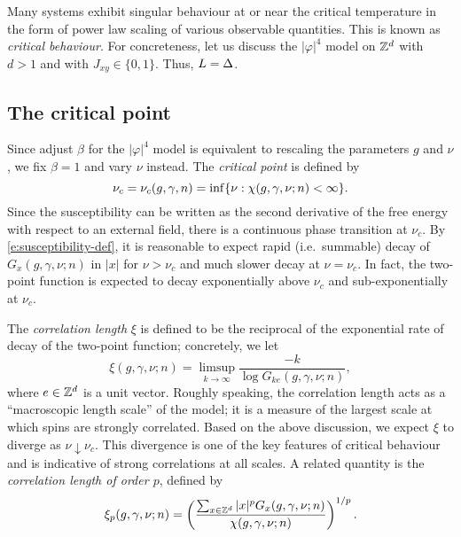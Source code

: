 Many systems exhibit singular behaviour at or near the critical temperature in
the form of power law scaling of various observable quantities. This is known as
\emph{critical behaviour}. For concreteness, let us discuss the $|\varphi|^4$ model
on ${ {{\mathbb Z}}^d }$ with $d > 1$ and with $J_{xy} \in \{ 0, 1 \}$. Thus, $L = \Delta$.

\subsection{The critical point}

Since adjust $\beta$ for the $|\varphi|^4$ model is equivalent to rescaling the
parameters $g$ and $\nu$, we fix $\beta = 1$ and vary $\nu$ instead.
The \emph{critical point} is defined by
\begin{equation}
\nu_c = \nu_c(g, \gamma, n) = \inf \{ \nu : \chi(g, \gamma, \nu; n) < \infty \}.
\end{equation}
Since the susceptibility can be written as the second derivative of the free energy
with respect to an external field, there is a continuous phase transition at $\nu_c$.
By \eqref{e:susceptibility-def}, it is
reasonable to expect rapid (i.e.\ summable) decay of $G_x(g, \gamma, \nu; n)$ in $|x|$ for
$\nu > \nu_c$ and much slower decay at $\nu = \nu_c$. In fact, the two-point function
is expected to decay exponentially above $\nu_c$ and sub-exponentially at $\nu_c$.

The \emph{correlation length} $\xi$ is defined to be the reciprocal of the exponential
rate of decay of the two-point function; concretely, we let
\begin{equation}
\xi(g, \gamma, \nu; n) = \limsup_{k\to\infty} \frac{-k}{\log G_{ke}(g, \gamma, \nu; n)},
\end{equation}
where $e \in { {{\mathbb Z}}^d }$ is a unit vector. Roughly speaking, the correlation length acts as
a ``macroscopic length scale'' of the model; it is a measure of the largest scale at
which spins are strongly correlated.
Based on the above discussion, we expect $\xi$
to diverge as $\nu\downarrow\nu_c$. This divergence is one of the
key features of critical behaviour and is indicative of strong correlations at all
scales. A related quantity is the \emph{correlation length of order $p$}, defined by
\begin{equation}
\label{e:clp-spins}
\xi_p(g, \gamma, \nu; n)
	=
\left(\frac{\sum_{x\in{ {{\mathbb Z}}^d }} |x|^p G_x(g, \gamma, \nu; n)}{\chi(g, \gamma, \nu; n)}\right)^{1/p}.
\end{equation}

